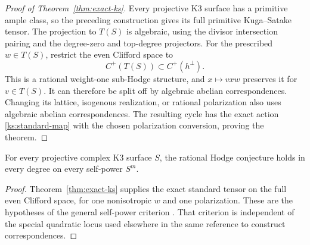 \begin{proof}[Proof of Theorem~\ref{thm:exact-ks}]
Every projective K3 surface has a primitive ample class,
so the preceding construction gives its full primitive
Kuga--Satake tensor.  The projection to $T(S)$ is algebraic,
using the divisor intersection pairing and the degree-zero
and top-degree projectors.  For the prescribed
$w\in T(S)$, restrict the even Clifford space to
\[
 C^+(T(S))\subset C^+(h^\perp).
\]
This is a rational weight-one sub-Hodge structure, and
$x\mapsto vxw$ preserves it for $v\in T(S)$.  It can
therefore be split off by algebraic abelian
correspondences.  Changing its lattice, isogenous
realization, or rational polarization also uses algebraic
abelian correspondences.  The resulting cycle has the
exact action \eqref{ks:standard-map} with the chosen
polarization conversion, proving the theorem.
\end{proof}

\begin{corollary}
 \label{cor:self-powers}
For every projective complex K3 surface $S$, the rational
Hodge conjecture holds in every degree on every self-power
$S^m$.
\end{corollary}

\begin{proof}
Theorem~\ref{thm:exact-ks} supplies the exact standard
tensor on the full even Clifford space, for one
nonisotropic $w$ and one polarization.  These are the
hypotheses of the general self-power criterion
\cite[Theorem~1.1]{AKS}.  That criterion is independent
of the special quadratic locus used elsewhere in the
same reference to construct correspondences.
\end{proof}
